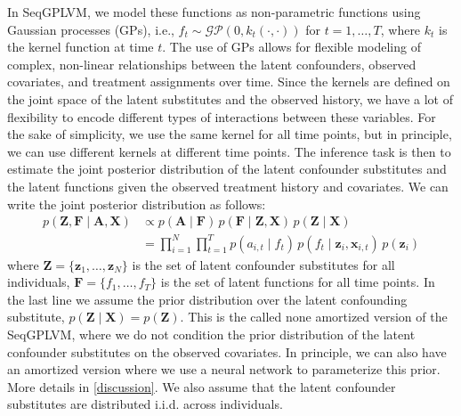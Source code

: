 In SeqGPLVM, we model these functions as non-parametric functions using Gaussian processes (GPs), 
i.e., \(f_t \sim \mathcal{GP}(0, k_t(\cdot, \cdot))\) for \(t = 1, \ldots, T\), where \(k_t\) is the kernel function at time \(t\). 
The use of GPs allows for flexible modeling of complex, non-linear 
relationships between the latent confounders, observed covariates, 
and treatment assignments over time. Since the kernels are defined on the joint space of the latent substitutes and the observed history, 
we have a lot of flexibility to encode different types of interactions between these variables. For the sake 
of simplicity, we use the same kernel for all time points, but in principle, 
we can use different kernels at different time points. The inference task is then to estimate the joint posterior 
distribution of the latent confounder substitutes and the latent functions given the observed treatment history and covariates. We can write 
the joint posterior distribution as follows:
\begin{align}
p(\mathbf{Z}, \mathbf{F} \mid \mathbf{A}, \mathbf{X})
&\propto p(\mathbf{A} \mid \mathbf{F})\, p(\mathbf{F} \mid \mathbf{Z}, \mathbf{X})\, p(\mathbf{Z}\mid \mathbf{X}) \\
&= \prod_{i=1}^N \prod_{t=1}^T p(a_{i,t} \mid f_t)\, p(f_t \mid \mathbf{z}_i, \mathbf{x}_{i,t})\, p(\mathbf{z}_i)
\end{align}
where \(\mathbf{Z} = \{\mathbf{z}_1, \ldots, \mathbf{z}_N\}\) is the set of 
latent confounder substitutes for all individuals, 
\(\mathbf{F} = \{f_1, \ldots, f_T\}\) is the set of latent functions for all 
time points. 
In the last line we assume the prior distribution over the latent 
confounding substitute,  \(p(\mathbf{Z}\mid \mathbf{X}) = p(\mathbf{Z})\). 
This is the called none amortized version of the SeqGPLVM, 
where we do not condition the prior distribution of the latent 
confounder substitutes on the observed covariates. 
In principle, we can also have an amortized version where we use a 
neural network to parameterize 
this prior. More details in \ref{discussion}. We also assume that the latent confounder substitutes are distributed 
i.i.d. across individuals. 

